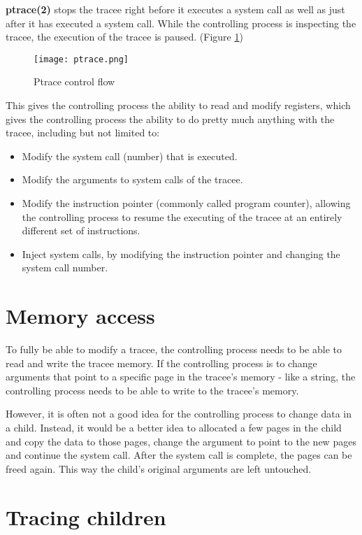 \documentclass[a4paper, twoside, 10pt, twocolumn]{report}
\begin{document}
\textbf{ptrace(2)} stops the tracee right before it executes a system call as
well as just after it has executed a system call.
While the controlling process is inspecting the tracee, the execution of the
tracee is paused. (Figure \ref{fig1})


\begin{figure}
\label{fig1}
\texttt{[image: ptrace.png]}
\caption{Ptrace control flow}
\end{figure}

This gives the controlling process the ability to read and modify registers,
which gives the controlling process the ability to do pretty much anything
with the tracee, including but not limited to:

\begin{itemize}
\item Modify the system call (number) that is executed.
\item Modify the arguments to system calls of the tracee.
\item Modify the instruction pointer (commonly called program counter), allowing
    the controlling process to resume the executing of the tracee at an entirely
    different set of instructions.
\item Inject system calls, by modifying the instruction pointer and changing the
    system call number.
\end{itemize}

\section{Memory access}

To fully be able to modify a tracee, the controlling process needs to be able to
read and write the tracee memory. If the controlling process is to change
arguments that point to a specific page in the tracee's memory - like a string,
the controlling process needs to be able to write to the tracee's memory.

However, it is often not a good idea for the controlling process to change data
in a child. Instead, it would be a better idea to allocated a few pages in the
child and copy the data to those pages, change the argument to point to the new
pages and continue the system call. After the system call is complete, the pages
can be freed again. This way the child's original arguments are left untouched.

\section{Tracing children}
\end{document}
